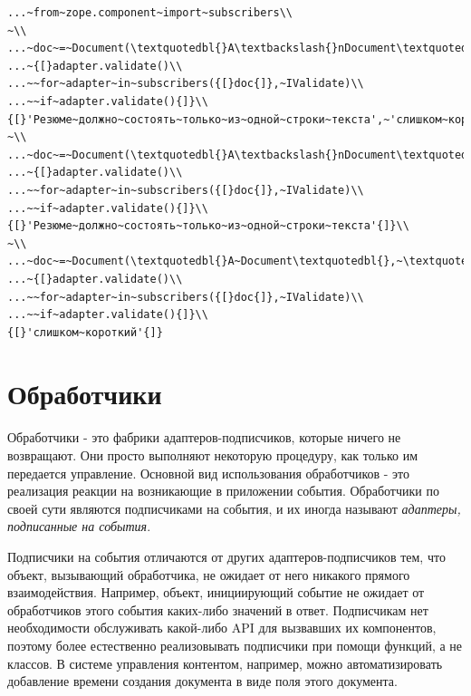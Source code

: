 \documentclass[a4paper,openany,twoside,draft]{book}
\providecommand*{\DUroletitlereference}[1]{\textsl{#1}}
\begin{document}
\begin{verbatim}
...~from~zope.component~import~subscribers\\
~\\
...~doc~=~Document(\textquotedbl{}A\textbackslash{}nDocument\textquotedbl{},~\textquotedbl{}lorum\textquotedbl{})\\
...~{[}adapter.validate()\\
...~~for~adapter~in~subscribers({[}doc{]},~IValidate)\\
...~~if~adapter.validate(){]}\\
{[}'Резюме~должно~состоять~только~из~одной~строки~текста',~'слишком~короткий'{]}\\
~\\
...~doc~=~Document(\textquotedbl{}A\textbackslash{}nDocument\textquotedbl{},~\textquotedbl{}ipsum\textquotedbl{}~*~1000)\\
...~{[}adapter.validate()\\
...~~for~adapter~in~subscribers({[}doc{]},~IValidate)\\
...~~if~adapter.validate(){]}\\
{[}'Резюме~должно~состоять~только~из~одной~строки~текста'{]}\\
~\\
...~doc~=~Document(\textquotedbl{}A~Document\textquotedbl{},~\textquotedbl{}dolor\textquotedbl{})\\
...~{[}adapter.validate()\\
...~~for~adapter~in~subscribers({[}doc{]},~IValidate)\\
...~~if~adapter.validate(){]}\\
{[}'слишком~короткий'{]}
\end{verbatim}


\section{Обработчики%
  \label{id47}%
}

Обработчики - это фабрики адаптеров-подписчиков, которые ничего не
возвращают.  Они просто выполняют некоторую процедуру, как только им
передается управление.  Основной вид использования обработчиков - это
реализация реакции на возникающие в приложении события.  Обработчики
по своей сути являются подписчиками на события, и их иногда называют
\DUroletitlereference{адаптеры, подписанные на события}.

Подписчики на события отличаются от других адаптеров-подписчиков тем,
что объект, вызывающий обработчика, не ожидает от него никакого
прямого взаимодействия.  Например, объект, инициирующий событие не
ожидает от обработчиков этого события каких-либо значений в ответ.
Подписчикам нет необходимости обслуживать какой-либо API для
вызвавших их компонентов, поэтому более естественно реализовывать
подписчики при помощи функций, а не классов.  В системе управления
контентом, например, можно автоматизировать добавление времени
создания документа в виде поля этого документа.
\end{document}
